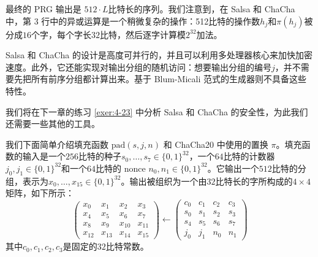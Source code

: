 \vspace*{5pt}

\noindent
最终的 PRG 输出是 $512\cdot L$比特长的序列。我们注意到，在 Salsa 和 ChaCha 中，第 3 行中的异或运算是一个稍微复杂的操作：512比特的操作数$h_j$和$\pi(h_j)$被分成$16$个字，每个字长$32$比特，然后逐字计算模$2^{32}$加法。

Salsa 和 ChaCha 的设计是高度可并行的，并且可以利用多处理器核心来加快加密速度。此外，它还能实现对输出分组的随机访问：想要输出分组的编号$j$，并不需要先把所有前序分组都计算出来。基于 Blum-Micali 范式的生成器则不具备这些特性。

我们将在下一章的练习 \ref{exer:4-23} 中分析 Salsa 和 ChaCha 的安全性，为此我们还需要一些其他的工具。

\begin{snote}[一些细节。]
我们下面简单介绍填充函数 $\mathrm{pad}(s,j,n)$ 和 ChaCha20 中使用的置换 $\pi$。填充函数的输入是一个$256$比特的种子$s_0,\dots,s_7\in\{0,1\}^{32}$，一个$64$比特的计数器$j_0,j_1\in\{0,1\}^{32}$和一个$64$比特的 nonce $n_0,n_1\in\{0,1\}^{32}$。它输出一个$512$比特的分组，表示为$x_0,\dots,x_{15}\in\{0,1\}^{32}$。输出被组织为一个由$32$比特长的字所构成的$4\times4$矩阵，如下所示：
\begin{equation}
\begin{pmatrix}
x_0 & x_1 & x_2 & x_3 \\
x_4 & x_5 & x_6 & x_7 \\
x_8 & x_9 & x_{10} & x_{11} \\
x_{12} & x_{13} & x_{14} & x_{15}
\end{pmatrix}
\longleftarrow
\begin{pmatrix}
c_0 & c_1 & c_2 & c_3 \\
s_0 & s_1 & s_2 & s_3 \\
s_4 & s_5 & s_6 & s_7 \\
j_0 & j_1 & n_0 & n_1
\end{pmatrix}
\end{equation}
其中$c_0,c_1,c_2,c_3$是固定的$32$比特常数。


\end{snote}
